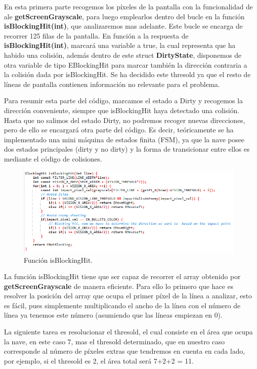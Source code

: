 En esta primera parte recogemos los píxeles de la pantalla con la funcionalidad de \ac{ale} \textbf{getScreenGrayscale}, para luego emplearlos dentro del bucle en la función \textbf{isBlockingHit(int)}, que analizaremos mas adelante. Este bucle se encarga de recorrer 125 filas de la pantalla. En función a la respuesta de \textbf{isBlockingHit(int)}, marcará una variable a true, la cual representa que ha habido una colisión, además dentro de este struct \textbf{DirtyState}, disponemos de otra variable de tipo EBlockingHit para marcar también la dirección contraria a la colisión dada por isBlockingHit. Se ha decidido este thresold ya que el resto de líneas de pantalla contienen información no relevante para el problema.

Para resumir esta parte del código, marcamos el estado a Dirty y recogemos la dirección conveniente, siempre que isBlockingHit haya detectado una colisión. Hasta que no salimos del estado Dirty, no podremos recoger nuevas direcciones, pero de ello se encargará otra parte del código. Es decir, teóricamente se ha implementado una mini máquina de estados finita (FSM), ya que la nave posee dos estados principales (dirty y no dirty) y la forma de transicionar entre ellos es mediante el código de colisiones.

\newpage
\begin{figure}[h]
	\centering
	\includegraphics[width=1\textwidth]{Figures/daisblocking}
	\caption{Función isBlockingHit.}
	\label{fig:daisblocking}
\end{figure}

La función isBlockingHit tiene que ser capaz de recorrer el array obtenido por \textbf{getScreenGrayscale} de manera eficiente. Para ello lo primero que hace es resolver la posición del array que ocupa el primer píxel de la línea a analizar, esto es fácil, pues simplemente multiplicando el ancho de la línea con el número de línea ya tenemos este número (asumiendo que las líneas empiezan en 0).

La siguiente tarea es resolucionar el thresold, el cual consiste en el área que ocupa la nave, en este caso 7, mas el thresold determinado, que en nuestro caso corresponde al número de píxeles extras que tendremos en cuenta en cada lado, por ejemplo, si el thresold es 2, el área total será 7+2+2 = 11.

